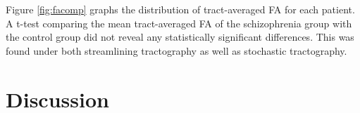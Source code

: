 Figure \ref{fig:facomp} graphs the distribution of tract-averaged FA for each patient.  A t-test comparing the mean tract-averaged FA of the schizophrenia group with the control group did not reveal any statistically significant differences.  This was found under both streamlining tractography as well as stochastic tractography.



\section{Discussion}
